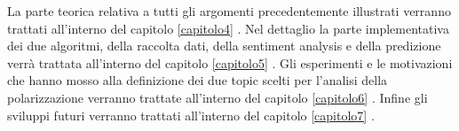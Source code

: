 La parte teorica relativa a tutti gli argomenti precedentemente illustrati verranno trattati all'interno del capitolo  \ref{capitolo4} \textit{}.
Nel dettaglio la parte implementativa dei due algoritmi, della raccolta dati, della sentiment analysis e della predizione verrà trattata all'interno del capitolo \ref{capitolo5} \textit{}.
Gli esperimenti e le motivazioni  che hanno mosso alla definizione dei due topic scelti per l'analisi della polarizzazione verranno trattate all'interno del capitolo  \ref{capitolo6} \textit{}.
Infine gli sviluppi futuri verranno trattati all'interno del capitolo  \ref{capitolo7} \textit{}.
\begin{comment}
\section{Inquadramento generale}
La prima parte contiene una frase che spiega l'area generale dove si svolge il lavoro; una che spiega la sottoarea pi\`u specifica dove si svolge il lavoro e la terza, che dovrebbe cominciare con le seguenti parole ``lo scopo della tesi \`e \dots'', illustra l'obbiettivo del lavoro. Poi vi devono essere una o due frasi che contengano una breve spiegazione di cosa e come \`e stato fatto, delle attivit\`a� sperimentali, dei risultati ottenuti con una valutazione e degli sviluppi futuri. La prima parte deve essere circa una facciata e mezza o due

\section{Breve descrizione del lavoro}
La seconda parte deve essere una esplosione della prima e deve quindi mostrare in maniera pi\`u esplicita l'area dove si svolge il lavoro, le fonti bibliografiche pi\`u importanti su cui si fonda il lavoro in maniera sintetica (una pagina) evidenziando i lavori in letteratura che presentano attinenza con il lavoro affrontato in modo da mostrare da dove e perch\'e \`e sorta la tematica di studio. Poi si mostrano esplicitamente le realizzazioni, le direttive future di ricerca, quali sono i problemi aperti e quali quelli affrontati e si ripete lo scopo della tesi. Questa parte deve essere piena (ma non grondante come la sezione due) di citazioni bibliografiche e deve essere lunga circa 4 facciate.

\section{Struttura della tesi}
La terza parte contiene la descrizione della struttura della tesi ed \`e organizzata nel modo seguente.
``La tesi \`e strutturata nel modo seguente.


\end{comment}
